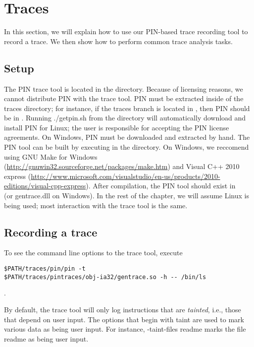 \section{Traces}

In this section, we will explain how to use our PIN-based trace
recording tool to record a trace.  We then show how to perform common
trace analysis tasks.

\subsection{Setup}

The PIN trace tool is located in the 
directory.  Because of licensing reasons, we cannot distribute PIN
with the trace tool.  PIN must be extracted inside of the traces
directory; for instance, if the traces branch is located in
, then PIN should be in
.  Running ./getpin.sh from the
 directory will automatically
download and install PIN for Linux; the user is responsible for
accepting the PIN license agreements.  On Windows, PIN must be
downloaded and extracted by hand.  The PIN tool can be built by
executing  in the 
directory.  On Windows, we reccomend using GNU Make for Windows
(\url{http://gnuwin32.sourceforge.net/packages/make.htm}) and Visual
C++ 2010 express
(\url{http://www.microsoft.com/visualstudio/en-us/products/2010-editions/visual-cpp-express}).
After compilation, the PIN tool should exist in \\
 (or
gentrace.dll on Windows).  In the rest of the chapter, we will assume
Linux is being used; most interaction with the trace tool is the same.

\subsection{Recording a trace}

To see the command line options to the trace tool, execute 

\begin{verbatim} 
$PATH/traces/pin/pin -t
$PATH/traces/pintraces/obj-ia32/gentrace.so -h -- /bin/ls
\end{verbatim}.

By default, the trace tool will only log instructions that are
\emph{tainted}, i.e., those that depend on user input.  The options
that begin with taint are used to mark various data
as being user input.  For instance, -taint-files readme marks the file
readme as being user input.

